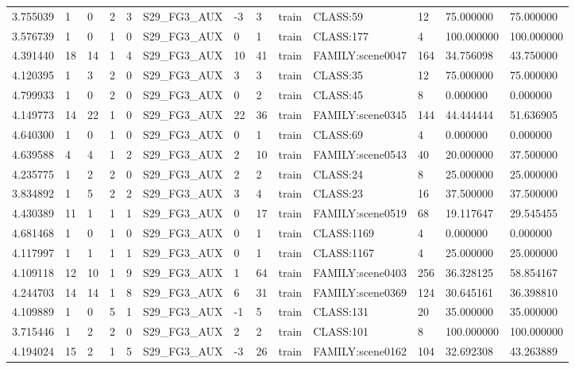 \begin{tabular}{lllllllllllll}
3.755039 & 1 & 0 & 2 & 3 & S29\_FG3\_AUX & -3 & 3 & train & CLASS:59 & 12 & 75.000000 & 75.000000 \\
3.576739 & 1 & 0 & 1 & 0 & S29\_FG3\_AUX & 0 & 1 & train & CLASS:177 & 4 & 100.000000 & 100.000000 \\
4.391440 & 18 & 14 & 1 & 4 & S29\_FG3\_AUX & 10 & 41 & train & FAMILY:scene0047 & 164 & 34.756098 & 43.750000 \\
4.120395 & 1 & 3 & 2 & 0 & S29\_FG3\_AUX & 3 & 3 & train & CLASS:35 & 12 & 75.000000 & 75.000000 \\
4.799933 & 1 & 0 & 2 & 0 & S29\_FG3\_AUX & 0 & 2 & train & CLASS:45 & 8 & 0.000000 & 0.000000 \\
4.149773 & 14 & 22 & 1 & 0 & S29\_FG3\_AUX & 22 & 36 & train & FAMILY:scene0345 & 144 & 44.444444 & 51.636905 \\
4.640300 & 1 & 0 & 1 & 0 & S29\_FG3\_AUX & 0 & 1 & train & CLASS:69 & 4 & 0.000000 & 0.000000 \\
4.639588 & 4 & 4 & 1 & 2 & S29\_FG3\_AUX & 2 & 10 & train & FAMILY:scene0543 & 40 & 20.000000 & 37.500000 \\
4.235775 & 1 & 2 & 2 & 0 & S29\_FG3\_AUX & 2 & 2 & train & CLASS:24 & 8 & 25.000000 & 25.000000 \\
3.834892 & 1 & 5 & 2 & 2 & S29\_FG3\_AUX & 3 & 4 & train & CLASS:23 & 16 & 37.500000 & 37.500000 \\
4.430389 & 11 & 1 & 1 & 1 & S29\_FG3\_AUX & 0 & 17 & train & FAMILY:scene0519 & 68 & 19.117647 & 29.545455 \\
4.681468 & 1 & 0 & 1 & 0 & S29\_FG3\_AUX & 0 & 1 & train & CLASS:1169 & 4 & 0.000000 & 0.000000 \\
4.117997 & 1 & 1 & 1 & 1 & S29\_FG3\_AUX & 0 & 1 & train & CLASS:1167 & 4 & 25.000000 & 25.000000 \\
4.109118 & 12 & 10 & 1 & 9 & S29\_FG3\_AUX & 1 & 64 & train & FAMILY:scene0403 & 256 & 36.328125 & 58.854167 \\
4.244703 & 14 & 14 & 1 & 8 & S29\_FG3\_AUX & 6 & 31 & train & FAMILY:scene0369 & 124 & 30.645161 & 36.398810 \\
4.109889 & 1 & 0 & 5 & 1 & S29\_FG3\_AUX & -1 & 5 & train & CLASS:131 & 20 & 35.000000 & 35.000000 \\
3.715446 & 1 & 2 & 2 & 0 & S29\_FG3\_AUX & 2 & 2 & train & CLASS:101 & 8 & 100.000000 & 100.000000 \\
4.194024 & 15 & 2 & 1 & 5 & S29\_FG3\_AUX & -3 & 26 & train & FAMILY:scene0162 & 104 & 32.692308 & 43.263889 \\

\end{tabular}

